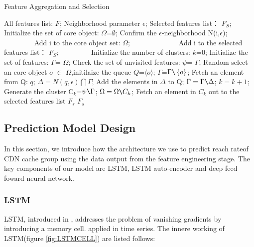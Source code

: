 \documentclass[5p]{elsarticle}
\newcommand{\dabiaolv}{reach rate}
\begin{document}
\begin{algorithm}[t]
\caption{Feature Aggregation and Selection} 
\begin{algorithmic}[1]
\Require  
    All features list: $F$;
    Neighborhood parameter $\epsilon$; 
\Ensure  
    Selected features list： $F_S$;  
\State Initialize the set of core object:  $\Omega$=$\emptyset$;
    \State Confirm the $\epsilon$-neighborhood\; N(i,$\epsilon$);
　　　　        \State Add i to the core object set: $\Omega$;
　　        \Else
　　　　        \State Add i to the selected features list： $F_S$;
　　　　    \EndIf
\EndFor
\State Initialize the number of clusters:  $k$=0;
\State Initialize the set of features:  $\Gamma$= $\Omega$;
\While{$\Omega\neq\emptyset$}
\State Check the set of unvisited features: $\psi$= $\Gamma$;
    \State Random select an core object $o$ $\in$ $\Omega$,initilaize the queue $Q$=$\langle o \rangle$;
\State $\Gamma$=$\Gamma \verb|\|\left\{o\right\}$;
    \State Fetch an element from Q: $q$;
    \State $\Delta=N(q,\epsilon)\bigcap\Gamma$;
    \State Add the elements in $\Delta$ to Q;
    \State  $\Gamma= \Gamma\verb|\|\Delta$;
\EndWhile
\State $k=k+1$;
\State Generate the cluster C$_k$=$\psi\verb|\|\Gamma$;
\State $\Omega=\Omega\verb|\|C_k$;
\EndWhile
{}
    \State Fetch an element in $C_k$ out to the selected features list $F_s$
\EndFor
\State \Return $F_s$
\end{algorithmic}
\end{algorithm}


\subsection{Prediction Model Design}

In this section, we introduce how the architecture we use to predict \dabiaolv of CDN cache group using the data output from the feature engineering stage. The key components of our model are LSTM, LSTM auto-encoder and deep feed foward neural network.

\subsubsection{LSTM}
LSTM, introduced in \cite{Hochreiter1997LongMemory}, addresses the problem of vanishing gradients by introducing a memory cell. \cite{MalhotraLongSeries} applied in time series. The innere working of LSTM(figure \ref{fig:LSTMCELL}) are listed follows:
\end{document}
